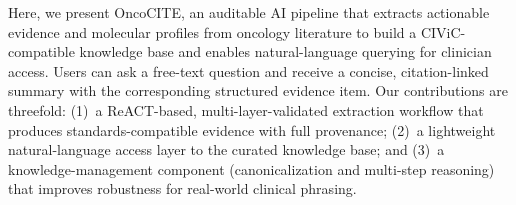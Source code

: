 Here, we present OncoCITE, an auditable AI pipeline that extracts actionable evidence and molecular profiles from oncology literature to build a CIViC-compatible knowledge base and enables natural-language querying for clinician access. Users can ask a free-text question and receive a concise, citation-linked summary with the corresponding structured evidence item. Our contributions are threefold: (1)~a ReACT-based, multi-layer-validated extraction workflow that produces standards-compatible evidence with full provenance; (2)~a lightweight natural-language access layer to the curated knowledge base; and (3)~a knowledge-management component (canonicalization and multi-step reasoning) that improves robustness for real-world clinical phrasing.

%
%
%
%
%
%

%
%
